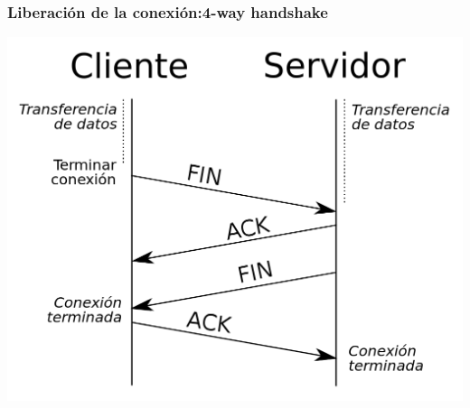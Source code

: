\documentclass{beamer}
\begin{document}
\begin{frame}
\frametitle{Liberación de la conexión:4-way handshake}
\includegraphics[scale=0.2]{4}\\
\end{frame}
 
\end{document}
